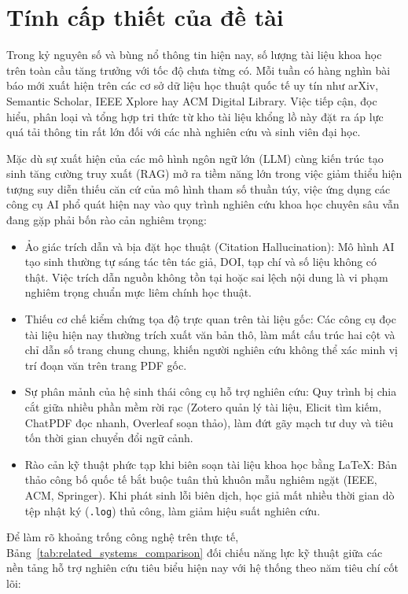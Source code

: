 \section{Tính cấp thiết của đề tài}
\label{sec:tinh_cap_thiet}
Trong kỷ nguyên số và bùng nổ thông tin hiện nay, số lượng tài liệu khoa học trên toàn cầu tăng trưởng với tốc độ chưa từng có. Mỗi tuần có hàng nghìn bài báo mới xuất hiện trên các cơ sở dữ liệu học thuật quốc tế uy tín như arXiv, Semantic Scholar, IEEE Xplore hay ACM Digital Library. Việc tiếp cận, đọc hiểu, phân loại và tổng hợp tri thức từ kho tài liệu khổng lồ này đặt ra áp lực quá tải thông tin rất lớn đối với các nhà nghiên cứu và sinh viên đại học.

Mặc dù sự xuất hiện của các mô hình ngôn ngữ lớn (LLM) cùng kiến trúc tạo sinh tăng cường truy xuất (RAG) mở ra tiềm năng lớn trong việc giảm thiểu hiện tượng suy diễn thiếu căn cứ của mô hình tham số thuần túy, việc ứng dụng các công cụ AI phổ quát hiện nay vào quy trình nghiên cứu khoa học chuyên sâu vẫn đang gặp phải bốn rào cản nghiêm trọng:
\begin{itemize}
    \item Ảo giác trích dẫn và bịa đặt học thuật (Citation Hallucination): Mô hình AI tạo sinh thường tự sáng tác tên tác giả, DOI, tạp chí và số liệu không có thật. Việc trích dẫn nguồn không tồn tại hoặc sai lệch nội dung là vi phạm nghiêm trọng chuẩn mực liêm chính học thuật.
    \item Thiếu cơ chế kiểm chứng tọa độ trực quan trên tài liệu gốc: Các công cụ đọc tài liệu hiện nay thường trích xuất văn bản thô, làm mất cấu trúc hai cột và chỉ dẫn số trang chung chung, khiến người nghiên cứu không thể xác minh vị trí đoạn văn trên trang PDF gốc.
    \item Sự phân mảnh của hệ sinh thái công cụ hỗ trợ nghiên cứu: Quy trình bị chia cắt giữa nhiều phần mềm rời rạc (Zotero quản lý tài liệu, Elicit tìm kiếm, ChatPDF đọc nhanh, Overleaf soạn thảo), làm đứt gãy mạch tư duy và tiêu tốn thời gian chuyển đổi ngữ cảnh.
    \item Rào cản kỹ thuật phức tạp khi biên soạn tài liệu khoa học bằng LaTeX: Bản thảo công bố quốc tế bắt buộc tuân thủ khuôn mẫu nghiêm ngặt (IEEE, ACM, Springer). Khi phát sinh lỗi biên dịch, học giả mất nhiều thời gian dò tệp nhật ký (\texttt{.log}) thủ công, làm giảm hiệu suất nghiên cứu.
\end{itemize}

Để làm rõ khoảng trống công nghệ trên thực tế, Bảng~\ref{tab:related_systems_comparison} đối chiếu năng lực kỹ thuật giữa các nền tảng hỗ trợ nghiên cứu tiêu biểu hiện nay với hệ thống \VS theo năm tiêu chí cốt lõi:

